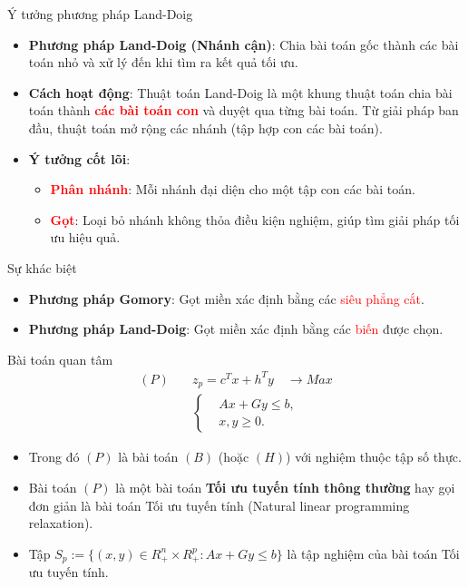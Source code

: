 \documentclass[10pt]{beamer}
\begin{document}
\begin{frame}{Ý tưởng phương pháp Land-Doig}
    \begin{itemize}
    \item \textbf{Phương pháp Land-Doig (Nhánh cận)}: Chia bài toán gốc thành các bài toán nhỏ và xử lý đến khi tìm ra kết quả tối ưu.
    \medskip
    \item \textbf{Cách hoạt động}: Thuật toán Land-Doig là một khung thuật toán chia bài toán thành \textcolor{red}{\textbf{các bài toán con}} và duyệt qua từng bài toán. Từ giải pháp ban đầu, thuật toán mở rộng các nhánh (tập hợp con các bài toán).
    \medskip
    \item \textbf{Ý tưởng cốt lõi}:
    \begin{itemize} 
        \item \textcolor{red}{\textbf{Phân nhánh}}: Mỗi nhánh đại diện cho một tập con các bài toán.
        \item \textcolor{red}{\textbf{Gọt}}: Loại bỏ nhánh không thỏa điều kiện nghiệm, giúp tìm giải pháp tối ưu hiệu quả.
    \end{itemize}
    \end{itemize}
\end{frame}

\begin{frame}{Sự khác biệt}
\large
\begin{itemize}
    \item \textbf{Phương pháp Gomory}: Gọt miền xác định bằng các \textcolor{red}{siêu phẳng cắt}.
    \item \textbf{Phương pháp Land-Doig}: Gọt miền xác định bằng các \textcolor{red}{biến} được chọn.
\end{itemize}
\end{frame}

\begin{frame}{Bài toán quan tâm}
\begin{equation}\label{P}
\begin{split}
(P) \quad & z_p=c^Tx+h^Ty \quad \longrightarrow Max \\
            & \left\{\begin{split}
                &Ax+Gy \leq  b, \\
                &x,y \geq 0.
            \end{split}\right.
\end{split}
\end{equation}
\begin{itemize}
\item Trong đó $(P)$ là bài toán $(B)$ (hoặc $(H)$) với nghiệm thuộc tập số thực.
\item Bài toán $(P)$ là một bài toán \textbf{Tối ưu tuyến tính thông thường} hay gọi đơn giản là bài toán Tối ưu tuyến tính (Natural linear programming relaxation).
\item Tập $S_p:=\{(x,y)\in R^n_+\times R^p_+: Ax+Gy\leq b\}$ là tập nghiệm của bài toán Tối ưu tuyến tính.
\end{itemize}
\end{frame}
\end{document}
